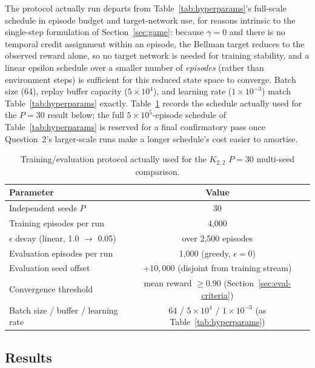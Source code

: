 \documentclass[a4paper,twoside,12pt]{report}
\begin{document}
The protocol actually run departs from Table~\ref{tab:hyperparams}'s
full-scale schedule in episode budget and target-network use, for reasons
intrinsic to the single-step formulation of Section~\ref{sec:game}: because
$\gamma = 0$ and there is no temporal credit assignment within an episode, the
Bellman target reduces to the observed reward alone, so no target network is
needed for training stability, and a linear epsilon schedule over a smaller
number of \emph{episodes} (rather than environment steps) is sufficient for
this reduced state space to converge. Batch size (64), replay buffer capacity
($5\times10^4$), and learning rate ($1\times10^{-3}$) match
Table~\ref{tab:hyperparams} exactly. Table~\ref{tab:q1-actual-protocol}
records the schedule actually used for the $P=30$ result below; the full
$5\times10^5$-episode schedule of Table~\ref{tab:hyperparams} is reserved for
a final confirmatory pass once Question~2's larger-scale runs make a longer
schedule's cost easier to amortise.

\begin{table}[H]
\centering
\caption{Training/evaluation protocol actually used for the $K_{2,2}$
$P=30$ multi-seed comparison.}
\label{tab:q1-actual-protocol}
\begin{tabular}{lc}
\toprule
\textbf{Parameter} & \textbf{Value} \\
\midrule
Independent seeds $P$                & 30 \\
Training episodes per run            & 4{,}000 \\
$\epsilon$ decay (linear, 1.0 $\to$ 0.05) & over 2{,}500 episodes \\
Evaluation episodes per run           & 1{,}000 (greedy, $\epsilon=0$) \\
Evaluation seed offset                & $+10{,}000$ (disjoint from training stream) \\
Convergence threshold                 & mean reward $\geq 0.90$ (Section~\ref{sec:eval-criteria}) \\
Batch size / buffer / learning rate   & 64 / $5\times10^4$ / $1\times10^{-3}$ (as Table~\ref{tab:hyperparams}) \\
\bottomrule
\end{tabular}
\end{table}

\subsection{Results}
\end{document}
